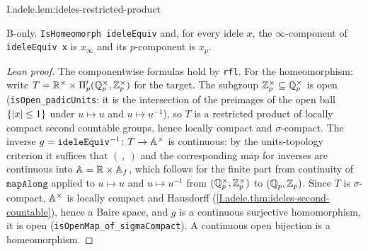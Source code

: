 \begin{lemma}
\bonly
{}
\end{lemma}
\begin{tfformal}{I.adele.lem:ideles-restricted-product}
\begin{tffidelity}
B-only. \texttt{IsHomeomorph ideleEquiv} and, for every idele $x$, the $\infty$-component of \texttt{ideleEquiv x} is $x_\infty$ and its $p$-component is $x_p$.
\end{tffidelity}
\end{tfformal}
\begin{proof}[Lean proof]
The componentwise formulas hold by \texttt{rfl}. For the homeomorphism: write $T=\mathbb{R}^\times\times\Pi'_p(\mathbb{Q}_p^\times,\mathbb{Z}_p^\times)$ for the target. The subgroup $\mathbb{Z}_p^\times\subseteq\mathbb{Q}_p^\times$ is open (\texttt{isOpen\_padicUnits}: it is the intersection of the preimages of the open ball $\{\lvert x\rvert\le1\}$ under $u\mapsto u$ and $u\mapsto u^{-1}$), so $T$ is a restricted product of locally compact second countable groups, hence locally compact and $\sigma$-compact. The inverse $g=\texttt{ideleEquiv}^{-1}\colon T\to\mathbb{A}^\times$ is continuous: by the units-topology criterion it suffices that $(\ ,\ )$ and the corresponding map for inverses are continuous into $\mathbb{A}=\mathbb{R}\times\mathbb{A}_f$, which follows for the finite part from continuity of $\texttt{mapAlong}$ applied to $u\mapsto u$ and $u\mapsto u^{-1}$ from $(\mathbb{Q}_p^\times,\mathbb{Z}_p^\times)$ to $(\mathbb{Q}_p,\mathbb{Z}_p)$. Since $T$ is $\sigma$-compact, $\mathbb{A}^\times$ is locally compact and Hausdorff (\cref{I.adele.thm:ideles-second-countable}), hence a Baire space, and $g$ is a continuous surjective homomorphism, it is open (\texttt{isOpenMap\_of\_sigmaCompact}). A continuous open bijection is a homeomorphism.
\end{proof}

